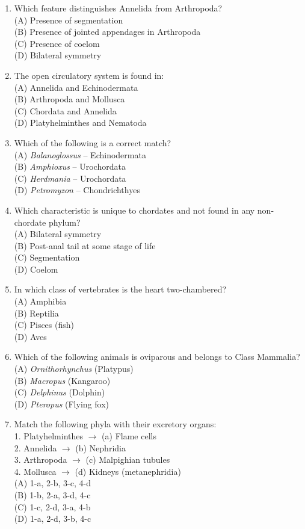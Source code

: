 \documentclass{article}
\begin{document}
\begin{enumerate}[label=Q\arabic*.]
\item Which feature distinguishes Annelida from Arthropoda?
\\(A) Presence of segmentation
\\(B) Presence of jointed appendages in Arthropoda
\\(C) Presence of coelom
\\(D) Bilateral symmetry

\item The open circulatory system is found in:
\\(A) Annelida and Echinodermata
\\(B) Arthropoda and Mollusca
\\(C) Chordata and Annelida
\\(D) Platyhelminthes and Nematoda

\item Which of the following is a correct match?
\\(A) \textit{Balanoglossus} -- Echinodermata
\\(B) \textit{Amphioxus} -- Urochordata
\\(C) \textit{Herdmania} -- Urochordata
\\(D) \textit{Petromyzon} -- Chondrichthyes

\item Which characteristic is unique to chordates and not found in any non-chordate phylum?
\\(A) Bilateral symmetry
\\(B) Post-anal tail at some stage of life
\\(C) Segmentation
\\(D) Coelom

\item In which class of vertebrates is the heart two-chambered?
\\(A) Amphibia
\\(B) Reptilia
\\(C) Pisces (fish)
\\(D) Aves

\item Which of the following animals is oviparous and belongs to Class Mammalia?
\\(A) \textit{Ornithorhynchus} (Platypus)
\\(B) \textit{Macropus} (Kangaroo)
\\(C) \textit{Delphinus} (Dolphin)
\\(D) \textit{Pteropus} (Flying fox)

\item Match the following phyla with their excretory organs:\\
1. Platyhelminthes $\rightarrow$ (a) Flame cells\\
2. Annelida $\rightarrow$ (b) Nephridia\\
3. Arthropoda $\rightarrow$ (c) Malpighian tubules\\
4. Mollusca $\rightarrow$ (d) Kidneys (metanephridia)
\\(A) 1-a, 2-b, 3-c, 4-d
\\(B) 1-b, 2-a, 3-d, 4-c
\\(C) 1-c, 2-d, 3-a, 4-b
\\(D) 1-a, 2-d, 3-b, 4-c


\end{enumerate}
\end{document}
